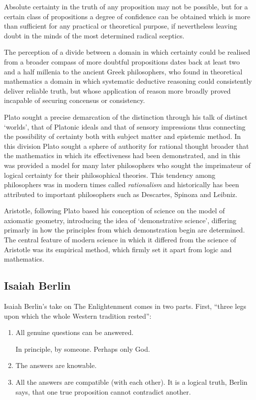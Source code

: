 Absolute certainty in the truth of any proposition may not be possible, but for a certain class of propositions a degree of confidence can be obtained which is more than sufficient for any practical or theoretical purpose, if nevertheless leaving doubt in the minds of the most determined radical sceptics.

The perception of a divide between a domain in which certainty could be realised from a broader compass of more doubtful propositions dates back at least two and a half millenia to the ancient Greek philosophers, who found in theoretical mathematics a domain in which systematic deductive reasoning could consistently deliver reliable truth, but whose application of reason more broadly proved incapable of securing concensus or consistency.

Plato sought a precise demarcation of the distinction through his talk of distinct `worlds', that of Platonic ideals and that of sensory impressions thus connecting the possibility of certainty both with subject matter and epistemic method.
In this division Plato sought a sphere of authority for rational thought broader that the mathematics in which its effectiveness had been demonstrated, and in this was provided a model for many later philosophers who sought the imprimateur of logical certainty for their philosophical theories.
This tendency among philosophers was in modern times called \emph{rationalism} and historically has been attributed to important philosophers such as Descartes, Spinoza and Leibniz.

Aristotle, following Plato based his conception of science on the model of axiomatic geometry, introducing the idea of `demonstrative science', differing primarly in how the principles from which demonstration begin are determined.
The central feature of modern science in which it differed from the science of Aristotle was its empirical method, which firmly set it apart from logic and mathematics.


\subsection{Isaiah Berlin}

Isaiah Berlin's take on The Enlightenment\cite{berlinRR} comes in two parts.
First, ``three legs upon which the whole Western tradition rested'':
\begin{enumerate}
  \item All genuine questions can be answered.

    In principle, by someone.  Perhaps only God.
\item  The answers are knowable.
\item All the answers are compatible (with each other).
  It is a logical truth, Berlin says, that one true proposition cannot contradict another.
\end{enumerate}

